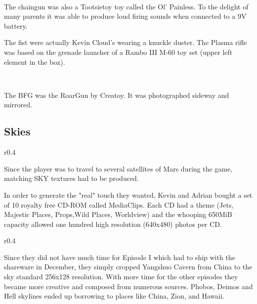 \\
\par

The chaingun was also a Tootsietoy toy called the Ol' Painless. To the delight of many parents it was able to produce loud firing sounds when connected to a 9V battery.

\par
{}

\vspace{-5mm}
The fist were actually Kevin Cloud's wearing a knuckle duster. The Plasma rifle was based on the grenade launcher of a Rambo III M-60 toy set (upper left element in the box).
\par
{}\\
\par
The BFG was the RoarGun by Creatoy. It was photographed sideway and mirrored.\\
\par
{}
\pagebreak


\subsection{Skies}
\begin{wrapfigure}[7]{r}{0.4\textwidth}
\centering
{}
\end{wrapfigure}
Since the player was to travel to several satellites of Mars during the game, matching SKY textures had to be produced.\\
\par In order to generate the "real" touch they wanted, Kevin and Adrian bought a set of 10 royalty free CD-ROM called MediaClips. Each CD had a theme (Jets, Majestic Places, Props,Wild Places, Worldview) and the whooping 650MiB capacity allowed one hundred high resolution (640x480) photos per CD.\\
\par 

\begin{wrapfigure}[7]{r}{0.4\textwidth}
\centering
{}
\end{wrapfigure}

 Since they did not have much time for Episode I which had to ship with the shareware in December, they simply cropped Yangshuo Cavern from China to the sky standard 256x128 resolution.  With more time for the other episodes they became more creative and composed from numerous sources. Phobos, Deimos and Hell skylines ended up borrowing to places like China, Zion, and Hawaii. \\
\par

